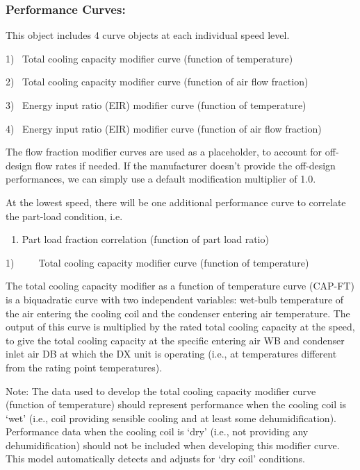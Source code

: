 \subsubsection{Performance Curves:}\label{performance-curves}

This object includes 4 curve objects at each individual speed level.

1)~ Total cooling capacity modifier curve (function of temperature)

2)~ Total cooling capacity modifier curve (function of air flow fraction)

3)~ Energy input ratio (EIR) modifier curve (function of temperature)

4)~ Energy input ratio (EIR) modifier curve (function of air flow fraction)

The flow fraction modifier curves are used as a placeholder, to account for off-design flow rates if needed. If the manufacturer doesn't provide the off-design performances, we can simply use a default modification multiplier of 1.0.

At the lowest speed, there will be one additional performance curve to correlate the part-load condition, i.e.

\begin{enumerate}
\def\labelenumi{\arabic{enumi})}
\setcounter{enumi}{4}
\tightlist
\item
  Part load fraction correlation (function of part load ratio)
\end{enumerate}

1)~~~~~Total cooling capacity modifier curve (function of temperature)

The total cooling capacity modifier as a function of temperature curve (CAP-FT) is a biquadratic curve with two independent variables: wet-bulb temperature of the air entering the cooling coil and the condenser entering air temperature. The output of this curve is multiplied by the rated total cooling capacity at the speed, to give the total cooling capacity at the specific entering air WB and condenser inlet air DB at which the DX unit is operating (i.e., at temperatures different from the rating point temperatures).

Note: The data used to develop the total cooling capacity modifier curve (function of temperature) should represent performance when the cooling coil is `wet' (i.e., coil providing sensible cooling and at least some dehumidification). Performance data when the cooling coil is `dry' (i.e., not providing any dehumidification) should not be included when developing this modifier curve. This model automatically detects and adjusts for `dry coil' conditions.

